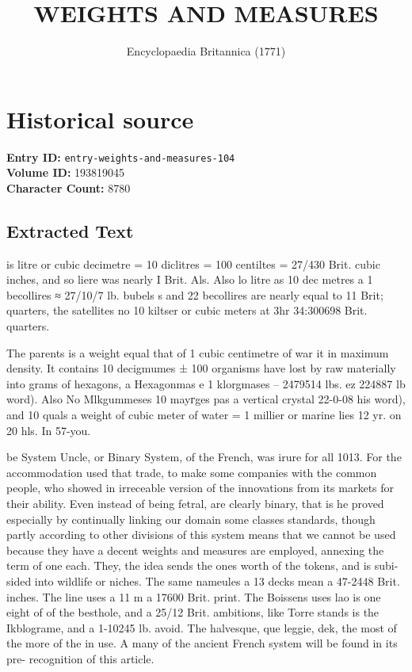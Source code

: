 \documentclass{article}
\title{WEIGHTS AND MEASURES}
\date{Encyclopaedia Britannica (1771)}
\begin{document}
\maketitle

\section*{Historical source}
\textbf{Entry ID:} \texttt{entry-weights-and-measures-104} \\
\textbf{Volume ID:} 193819045 \\
\textbf{Character Count:} 8780

\subsection*{Extracted Text}
is litre or cubic decimetre = 10 diclitres = 100 centiltes = 27/430 Brit. cubic inches, and so liere was nearly I Brit. Als. Also lo litre as 10 dec metres a 1 becollires ≈ 27/10/7 lb. bubels s and 22 becollires are nearly equal to 11 Brit; quarters, the satellites no 10 kiltser or cubic meters at 3hr 34:300698 Brit. quarters.

The parents is a weight equal that of 1 cubic centimetre of war it in maximum density. It contains 10 decigmumes ± 100 organisms have lost by raw materially into grams of hexagons, a Hexagonmas e 1 klorgmases – 2479514 lbs. ez 224887 lb word). Also No Mlkgummeses 10 mayгges pas a vertical crystal 22-0-08 his word), and 10 quals a weight of cubic meter of water = 1 millier or marine lies 12 yr. on 20 hls. In 57-you.

be System Uncle, or Binary System, of the French, was irure for all 1013. For the accommodation used that trade, to make some companies with the common people, who showed in irreceable version of the innovations from its markets for their ability. Even instead of being fetral, are clearly binary, that is he proved especially by continually linking our domain some classes standards, though partly according to other divisions of this system means that we cannot be used because they have a decent weights and measures are employed, annexing the term of one each. They, the idea sends the ones worth of the tokens, and is subi- sided into wildlife or niches. The same nameules a 13 decks mean a 47-2448 Brit. inches. The line uses a 11 m a 17600 Brit. print. The Boissens uses lao is one eight of of the besthole, and a 25/12 Brit. ambitions, like Torre stands is the Ikblograme, and a 1-10245 lb. avoid. The halvesque, que leggie, dek, the most of the more of the in use. A many of the ancient French system will be found in its pre- recognition of this article.
\end{document}
